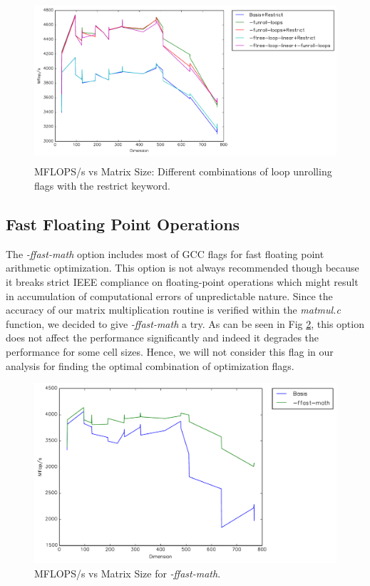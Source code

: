 \documentclass{article}
\begin{document}
    \begin{figure}[h]
    \centering
    \includegraphics[width=14cm,height=6cm]{timing-restrict-final.pdf}
    \caption{MFLOPS/s vs Matrix Size: Different combinations of loop unrolling flags with the restrict keyword.}
    \label{fig:restrict}
  \end{figure}

\subsection{Fast Floating Point Operations}

The \textit{-ffast-math} option includes most of GCC flags for fast floating point arithmetic optimization.  This option is not always recommended though because it breaks strict IEEE compliance on floating-point operations which might result in accumulation of computational errors of unpredictable nature. Since the accuracy of our matrix multiplication routine is verified within the \textit{ matmul.c} function, we decided to give \textit{-ffast-math} a try. As can be seen in Fig \ref{fig:timing-math}, this option does not affect the performance significantly and indeed it degrades the performance for some cell sizes. Hence, we will not consider this flag in our analysis for finding the optimal combination of optimization flags.
 

  \begin{figure}[h]
    \centering
    \includegraphics[width=.7\textwidth]{timing-math.pdf}
    \caption{MFLOPS/s vs Matrix Size for \textit{-ffast-math}.}
    \label{fig:timing-math}
  \end{figure}
\end{document}
